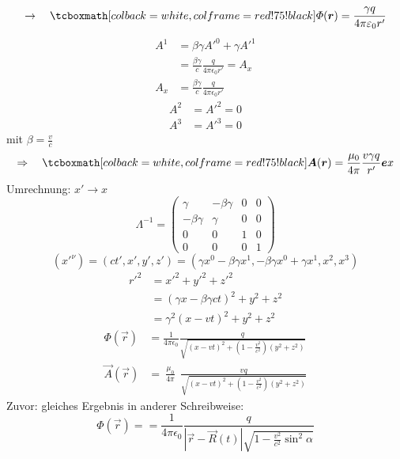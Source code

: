\begin{equation*}
\rightarrow \quad \rmbox{\Phi (\vec{r}) = \frac{\gamma q}{4 \pi \epsilon_0 r'}}
\end{equation*}
\begin{align*}
A^{1} &= \beta \gamma A'^{0} + \gamma A'^{1}\\
&= \frac{\beta \gamma}{c} \frac{q}{4 \pi \epsilon_0 r'} = A_x\\
A_{x }&=  \frac{\beta \gamma}{c} \frac{q}{4 \pi \epsilon_0 r'}
\end{align*}
\begin{align}
A^{2} &= A'^{2} = 0\\
A^{3} &= A'^{3} = 0
\end{align}
mit $ \beta = \frac{v}{c} $
\begin{equation*}
\Rightarrow \quad \rmbox{\vec{A}(\vec{r}) = \frac{\mu_0}{4 \pi} \frac{v \gamma q}{r'} \vec{e}x}
\end{equation*}
Umrechnung: $ x' \to x $
\begin{equation*}
\Lambda^{-1} = \begin{pmatrix}
\gamma & - \beta \gamma & 0 & 0 \\
- \beta \gamma & \gamma & 0 & 0 \\
0 & 0 & 1 & 0 \\
0 & 0 & 0 & 1
\end{pmatrix}
\end{equation*}
\begin{equation*}
(x'^{\nu}) = ( ct', x', y', z') = (\gamma x^{0} - \beta \gamma x^{1}, - \beta \gamma x^{0} + \gamma x^{1}, x^{2}, x^{3})
\end{equation*}
\begin{align*}
r'^{2} &= x'^2 + y'^2 + z'^2\\
&= (\gamma x - \beta \gamma ct)^2 + y^2 + z^2\\
&= \gamma^2 (x - vt)^2 + y^2 + z^2
\end{align*}
\begin{align*}
\Phi(\vec{r}) &= \frac{1}{4 \pi \epsilon_0}\frac{q}{\sqrt{(x - vt)^2 + (1 - \frac{v^2}{c^2})(y^2 + z^2)}} \\
\vec{A}(\vec{r}) &= \ \frac{\mu_0}{4 \pi} \ \: \frac{v q}{\sqrt{(x - vt)^2 + (1 - \frac{v^2}{c^2})(y^2 + z^2)}}
\end{align*}
Zuvor: gleiches Ergebnis in anderer Schreibweise:
\begin{equation*}
\Phi(\vec{r}) = = \frac{1}{4 \pi \epsilon_0} \frac{q}{|\vec{r} - \vec{R}(t)| \sqrt{1 - \frac{v^2}{c^2} \sin^2 \alpha}}
\end{equation*}
%
%
%
%
%
%
